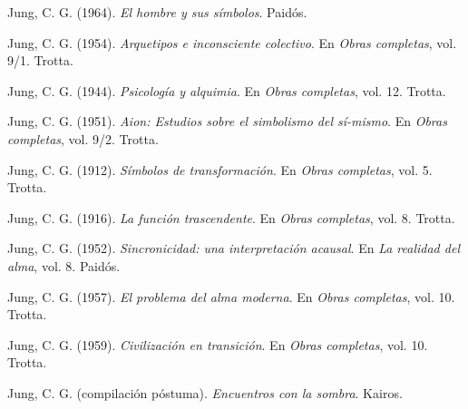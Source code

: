 \begin{thebibliography}{99}
	
	Jung, C. G. (1964). \emph{El hombre y sus símbolos}. Paidós.
	
	Jung, C. G. (1954). \emph{Arquetipos e inconsciente colectivo}. En \emph{Obras completas}, vol. 9/1. Trotta.
	
	Jung, C. G. (1944). \emph{Psicología y alquimia}. En \emph{Obras completas}, vol. 12. Trotta.
	
	Jung, C. G. (1951). \emph{Aion: Estudios sobre el simbolismo del sí-mismo}. En \emph{Obras completas}, vol. 9/2. Trotta.
	
	Jung, C. G. (1912). \emph{Símbolos de transformación}. En \emph{Obras completas}, vol. 5. Trotta.
	
	Jung, C. G. (1916). \emph{La función trascendente}. En \emph{Obras completas}, vol. 8. Trotta.
	
	Jung, C. G. (1952). \emph{Sincronicidad: una interpretación acausal}. En \emph{La realidad del alma}, vol. 8. Paidós.
	
	Jung, C. G. (1957). \emph{El problema del alma moderna}. En \emph{Obras completas}, vol. 10. Trotta.
	
	Jung, C. G. (1959). \emph{Civilización en transición}. En \emph{Obras completas}, vol. 10. Trotta.
	
	Jung, C. G. (compilación póstuma). \emph{Encuentros con la sombra}. Kairos.
	
\end{thebibliography}
